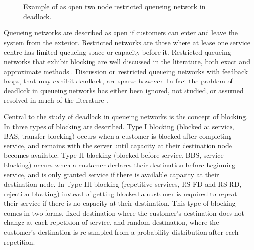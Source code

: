 \documentclass{article}
\numberwithin{equation}{section}
\begin{document}
\begin{figure}[!htbp]
  \begin{center}
  
  \end{center}
  \caption{Example of as open two node restricted queueing network in deadlock.}
  \label{fig:1st_example}
\end{figure}

Queueing networks are described as open if customers can enter and leave the system from the exterior.
Restricted networks are those where at lease one service centre has limited queueing space or capacity before it.
Restricted queueing networks that exhibit blocking are well discussed in the literature, both exact \cite{hunt56, baber08, aviitzhakyadin65, koizumietal05, latoucheneuts80, perrosetal88, gordonnewell67} and approximate methods \cite{takahashi80, korporaaletal00, onvural90, perrosetal88, dalleryfrein93, allonetal13}. Discussion on restricted queueing networks with feedback loops, that may exhibit deadlock, are sparse however.
In fact the problem of deadlock in queueing networks has either been ignored, not studied, or assumed resolved in much of the literature \cite{onvural90, perrosetal88}.

Central to the study of deadlock in queueing networks is the concept of blocking.
In \cite{onvuralperros86} three types of blocking are described.
Type I blocking (blocked at service, BAS, transfer blocking) occurs when a customer is blocked after completing service, and remains with the server until capacity at their destination node becomes available.
Type II blocking (blocked before service, BBS, service blocking) occurs when a customer declares their destination before beginning service, and is only granted service if there is available capacity at their destination node.
In Type III blocking (repetitive services, RS-FD and RS-RD, rejection blocking) instead of getting blocked a customer is required to repeat their service if there is no capacity at their destination. This type of blocking comes in two forms, fixed destination where the customer's destination does not change at each repetition of service, and random destination, where the customer's destination is re-sampled from a probability distribution after each repetition.
\end{document}
